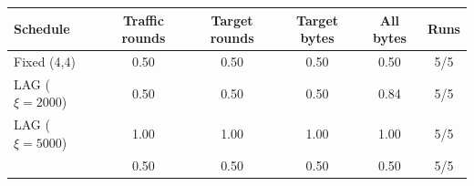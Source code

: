 \begin{tabular}{@{}lccccc@{}}
\toprule
Schedule & Traffic rounds & Target rounds & Target bytes & All bytes & Runs\\
\midrule
Fixed (4,4) & 0.50 & 0.50 & 0.50 & 0.50 & 5/5\\
LAG ($\xi=2000$) & 0.50 & 0.50 & 0.50 & 0.84 & 5/5\\
LAG ($\xi=5000$) & 1.00 & 1.00 & 1.00 & 1.00 & 5/5\\
\tierfed{} & 0.50 & 0.50 & 0.50 & 0.50 & 5/5\\
\bottomrule
\end{tabular}
